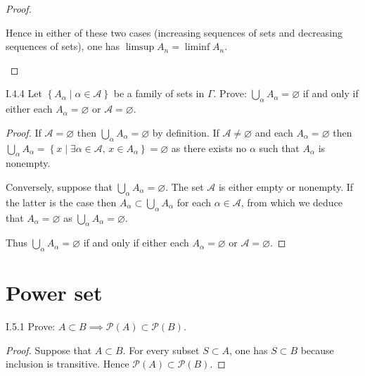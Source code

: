 \begin{proof}
\begin{enumerate}[label={(\alph*)}, leftmargin=*]
		      Hence in either of these two cases (increasing sequences of sets and decreasing sequences of sets), one has \( \limsup A_{n} = \liminf A_{n} \).
	\end{enumerate}
\end{proof}

\begin{problem}{I.4.4}
Let \( \left\{ A_{\alpha} \mid \alpha \in \mathscr{A} \right\} \) be a family of sets in \( \Gamma \). Prove: \( \displaystyle\bigcup_{\alpha} A_{\alpha} = \varnothing \) if and only if either each \( A_{\alpha} = \varnothing \) or \( \mathscr{A} = \varnothing \).
\end{problem}

\begin{proof}
	If \( \mathscr{A} = \varnothing \) then \( \bigcup_{\alpha} A_{\alpha} = \varnothing \) by definition. If \( \mathscr{A} \ne \varnothing \) and each \( A_{\alpha} = \varnothing \) then \( \bigcup_{\alpha} A_{\alpha} = \left\{ x \mid \exists \alpha\in\mathscr{A},\, x\in A_{\alpha} \right\} = \varnothing \) as there exists no \( \alpha \) such that \( A_{\alpha} \) is nonempty.

	Conversely, suppose that \( \bigcup_{\alpha} A_{\alpha} = \varnothing \). The set \( \mathscr{A} \) is either empty or nonempty. If the latter is the case then \( A_{\alpha} \subset \bigcup_{\alpha} A_{\alpha} \) for each \( \alpha\in\mathscr{A} \), from which we deduce that \( A_{\alpha} = \varnothing \) as \( \bigcup_{\alpha} A_{\alpha} = \varnothing \).

	Thus \( \displaystyle\bigcup_{\alpha} A_{\alpha} = \varnothing \) if and only if either each \( A_{\alpha} = \varnothing \) or \( \mathscr{A} = \varnothing \).
\end{proof}

\section{Power set}

\begin{problem}{I.5.1}
Prove: \( A \subset B \implies \mathscr{P}(A) \subset \mathscr{P}(B) \).
\end{problem}

\begin{proof}
	Suppose that \( A \subset B \). For every subset \( S \subset A \), one has \( S \subset B \) because inclusion is transitive. Hence \( \mathscr{P}(A) \subset \mathscr{P}(B) \).
\end{proof}

